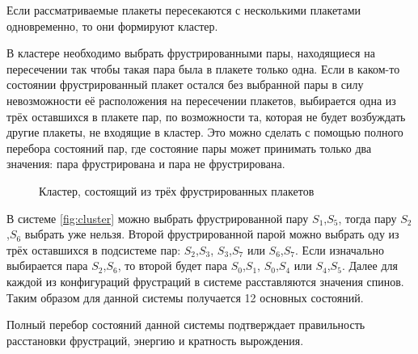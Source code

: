 \documentclass[utf8, babel, sor, jor, amsmath, amssymb, reprint]{elsarticle} %
\begin{document}
Если рассматриваемые плакеты пересекаются с несколькими плакетами одновременно, то они формируют кластер.

В кластере необходимо выбрать фрустрированными пары, находящиеся на пересечении так чтобы такая пара была в плакете только одна. Если в каком-то состоянии фрустрированный плакет остался без выбранной пары в силу невозможности её расположения на пересечении плакетов, выбирается одна из трёх оставшихся в плакете пар, по возможности та, которая не будет возбуждать другие плакеты, не входящие в кластер. Это можно сделать с помощью полного перебора состояний пар, где состояние пары может принимать только два значения: пара фрустрирована и пара не фрустрирована.

\begin{figure}[H]
	\centering
	\caption{Кластер, состоящий из трёх фрустрированных плакетов}
	\label{fig:cluster}
\end{figure}

В системе \eqref{fig:cluster}  можно выбрать фрустрированной пару $S_1$,$S_5$, тогда пару  $S_2$,$S_6$ выбрать уже нельзя. Второй фрустрированной парой можно выбрать оду из трёх оставшихся в подсистеме пар: $S_2$,$S_3$, $S_3$,$S_7$ или $S_6$,$S_7$. Если изначально выбирается пара $S_2$,$S_6$, то второй будет пара $S_0$,$S_1$, $S_0$,$S_4$ или $S_4$,$S_5$. Далее для каждой из конфигураций фрустраций в системе расставляются значения спинов. Таким образом для данной системы получается 12 основных состояний. 

Полный перебор состояний данной системы подтверждает правильность расстановки фрустраций, энергию и кратность вырождения.
\end{document}
